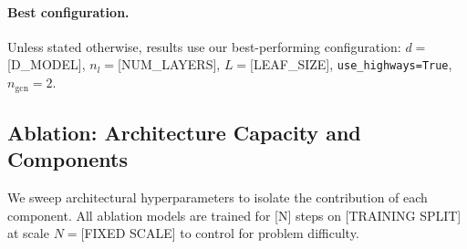 \documentclass[acmtog,anonymous,review]{acmart}
\begin{document}
\paragraph{Best configuration.}
Unless stated otherwise, results use our best-performing configuration:
$d = $[D\_MODEL], $n_l = $[NUM\_LAYERS], $L = $[LEAF\_SIZE],
\texttt{use\_highways=True}, $n_\mathrm{gcn} = 2$.

\subsection{Ablation: Architecture Capacity and Components}
\label{sec:ablation}

We sweep architectural hyperparameters to isolate the contribution of each component.
All ablation models are trained for [N] steps on [TRAINING SPLIT] at scale $N = $[FIXED SCALE]
to control for problem difficulty.
\end{document}
